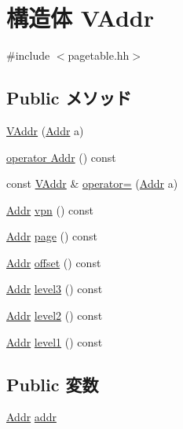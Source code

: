\hypertarget{structPowerISA_1_1VAddr}{
\section{構造体 VAddr}
\label{structPowerISA_1_1VAddr}
}


{\ttfamily \#include $<$pagetable.hh$>$}\subsection*{Public メソッド}
\begin{DoxyCompactItemize}
\item 
\hyperlink{structPowerISA_1_1VAddr_aea4be566b2249d0b69dcee270c8b461d}{VAddr} (\hyperlink{base_2types_8hh_af1bb03d6a4ee096394a6749f0a169232}{Addr} a)
\item 
\hyperlink{structPowerISA_1_1VAddr_acb58a2b913b1ee45cf52ff8a6f5297c5}{operator Addr} () const 
\item 
const \hyperlink{structPowerISA_1_1VAddr}{VAddr} \& \hyperlink{structPowerISA_1_1VAddr_a7a4215209d20e18c277206574eb1a86e}{operator=} (\hyperlink{base_2types_8hh_af1bb03d6a4ee096394a6749f0a169232}{Addr} a)
\item 
\hyperlink{base_2types_8hh_af1bb03d6a4ee096394a6749f0a169232}{Addr} \hyperlink{structPowerISA_1_1VAddr_ab81a86f36291439a60bf57c10ae767f4}{vpn} () const 
\item 
\hyperlink{base_2types_8hh_af1bb03d6a4ee096394a6749f0a169232}{Addr} \hyperlink{structPowerISA_1_1VAddr_a0a2c0c43cd466cb2730c9387a7061a2b}{page} () const 
\item 
\hyperlink{base_2types_8hh_af1bb03d6a4ee096394a6749f0a169232}{Addr} \hyperlink{structPowerISA_1_1VAddr_ad7614ecd306d0a915379cd6fae8b02de}{offset} () const 
\item 
\hyperlink{base_2types_8hh_af1bb03d6a4ee096394a6749f0a169232}{Addr} \hyperlink{structPowerISA_1_1VAddr_a4ea534e4bdbdfebe2d82eddb86284b5d}{level3} () const 
\item 
\hyperlink{base_2types_8hh_af1bb03d6a4ee096394a6749f0a169232}{Addr} \hyperlink{structPowerISA_1_1VAddr_a5fb0a2faeaa59b4d186256f71f494020}{level2} () const 
\item 
\hyperlink{base_2types_8hh_af1bb03d6a4ee096394a6749f0a169232}{Addr} \hyperlink{structPowerISA_1_1VAddr_a6fac2640aa06dbd7e9cf8af5b81f8969}{level1} () const 
\end{DoxyCompactItemize}
\subsection*{Public 変数}
\begin{DoxyCompactItemize}
\item 
\hyperlink{base_2types_8hh_af1bb03d6a4ee096394a6749f0a169232}{Addr} \hyperlink{structPowerISA_1_1VAddr_a0bb77b4ba61e408313e1118250f9278c}{addr}
\end{DoxyCompactItemize}
